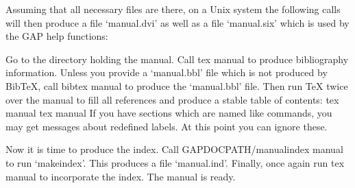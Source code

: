 Assuming that all necessary files are there,
on a Unix system the following calls will then produce a file `manual.dvi'
as well as a file `manual.six' which is used by the GAP help functions:

Go to the directory holding the manual. Call
\begintt
tex manual
\endtt
to produce bibliography information. Unless you provide a `manual.bbl' file
which is not produced by Bib{\TeX}, call
\begintt
bibtex manual
\endtt
to produce the `manual.bbl' file. Then run {\TeX} twice over the manual to
fill all references and produce a stable table of contents:
\begintt
tex manual
tex manual
\endtt
If you have sections which are named like commands, you may get messages
about redefined labels. At this point you can ignore these.

Now it is time to produce the index. Call
\begintt
GAPDOCPATH/manualindex manual
\endtt
to run `makeindex'. This produces a file `manual.ind'. Finally, once again
run
\begintt
tex manual
\endtt
to incorporate the index. The manual is ready.


